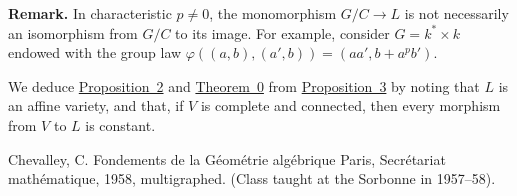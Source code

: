 \documentclass{article}
\newenvironment{rmenv}[1]
  {\phantomsection\par\medskip\noindent\textbf{#1.}\rmfamily}
  {\medskip}
\begin{document}
\begin{rmenv}{Remark}
  \marginpar{\dbend}
  In characteristic $p\neq0$, the monomorphism $G/C\to L$ is not necessarily an isomorphism from $G/C$ to its image.
  For example, consider $G=k^*\times k$ endowed with the group law $\varphi((a,b),(a',b))=(aa',b+a^pb')$.
\end{rmenv}

We deduce \hyperref[proposition2]{Proposition~2} and \hyperref[theorem0]{Theorem~0} from \hyperref[proposition3]{Proposition~3} by noting that $L$ is an affine variety, and that, if $V$ is complete and connected, then every morphism from $V$ to $L$ is constant.




\nocite{*}

\begin{thebibliography}{1}

  {\sc Chevalley, C.}
  \newblock Fondements de la G\'{e}om\'{e}trie alg\'{e}brique
  \newblock Paris, Secr\'{e}tariat math\'{e}matique, 1958, multigraphed.
  \newblock (Class taught at the Sorbonne in 1957--58).

\end{thebibliography}
\end{document}
